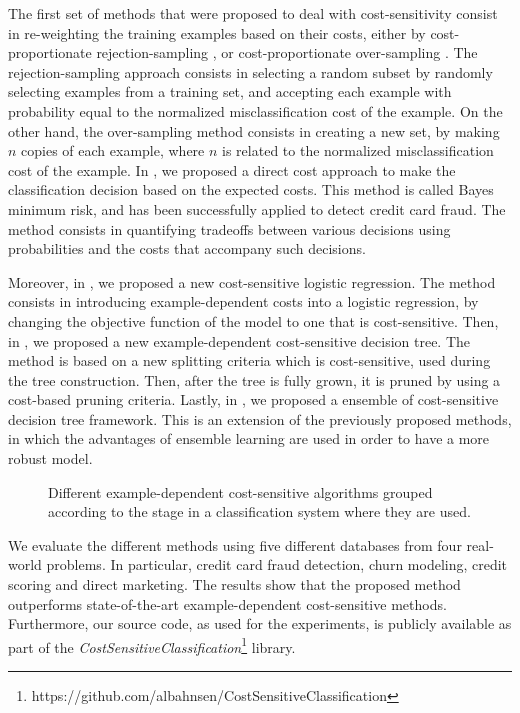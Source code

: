  The first set of methods that were proposed to deal with cost-sensitivity consist in 
  re-weighting the training examples based on their costs, either by cost-proportionate 
  rejection-sampling \citep{Zadrozny2003}, or cost-proportionate over-sampling \citep{Elkan2001}.
  The rejection-sampling approach consists in selecting a random subset by randomly 
  selecting examples from a training set, and accepting each example with probability equal to 
  the normalized misclassification cost of the example. On the other hand, the over-sampling 
  method consists in creating a new set, by making $n$ copies of each example, where $n$ is related 
  to the normalized misclassification cost of the example.
  In \citep{CorreaBahnsen2013,CorreaBahnsen2014}, we proposed a direct cost approach to make the 
  classification decision based on the expected costs. This method is called Bayes minimum risk, and 
  has been successfully applied to detect credit card fraud. The method   
  consists in quantifying tradeoffs between various decisions using probabilities and the costs   
  that accompany such decisions. 
  
  Moreover, in \cite{CorreaBahnsen2014b}, we proposed a new cost-sensitive logistic regression. The 
  method consists in introducing example-dependent costs into a logistic regression, by changing 
  the objective function of the model to one that is  cost-sensitive. 
  Then, in \cite{CorreaBahnsen2015}, we proposed a new example-dependent cost-sensitive decision 
  tree. The method is based on a new splitting criteria which is cost-sensitive, used during the 
  tree construction. Then, after the tree is fully grown, it is pruned by using a cost-based 
  pruning criteria. Lastly, in \cite{CorreaBahnsen2015c}, we proposed a ensemble of cost-sensitive 
  decision tree framework. This is an extension of the previously proposed methods, in which the 
  advantages of ensemble learning are used in order to have a more robust model.

  \begin{figure}
  \centering
  
  \caption{Different example-dependent cost-sensitive algorithms grouped according to the 
    stage in a classification system where they are used.}
  \label{fig:1:1}
  \end{figure}
  
  We evaluate the different methods using five different databases from four real-world problems. In 
  particular, credit card fraud detection, churn modeling, credit scoring and direct marketing. 
  The results show that the proposed method outperforms state-of-the-art  example-dependent   
  cost-sensitive methods. Furthermore, our source code, as used for the experiments, is publicly 
  available as part of the \textit{CostSensitiveClassification}\footnote{
  https://github.com/albahnsen/CostSensitiveClassification} library.
  
